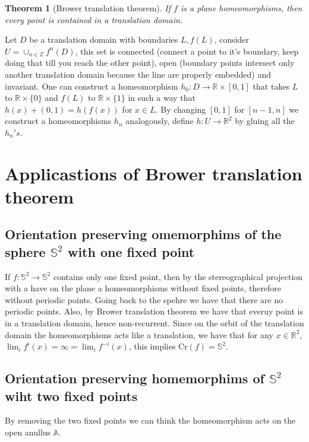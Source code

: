 \documentclass{article}
\newtheorem{theorem}{Theorem}[section]
\begin{document}
\begin{theorem}[Brower translation theorem]
    If $f$ is a plane homeomorphisms, then every point is contained in a 
    translation domain.
\end{theorem}


Let $D$ be a translation domain with boundaries $L,f(L)$, consider $U=\cup_{n\in
\mathbb{Z}}f^n(D)$, this set is connected (connect  a point to it's boundary, keep doing that till
you reach the other point), open (boundary points intersect only another translation domain 
because the line are properly embedded) and invariant. 
One can construct a homeomorphism $h_0: D\to \mathbb{R}\times [0,1]$ that takes
$L$ to $\mathbb{R}\times \{0\}$ and $f(L)$ to $\mathbb{R}\times\{1\}$ in such 
a way that $h(x)+(0,1)=h(f(x))$ for $x\in L$. By changing $[0,1]$ for $[n-1,n]$
we construct a homeomorphisms $h_n$ analogously, define $h:U\to \mathbb{R}^2$ 
by gluing all the $h_n's$. 




\section{Applicastions of Brower translation theorem}

\subsection{
    Orientation preserving omemorphims of the sphere $\mathbb{S}^2$ with one fixed point}

If $f:\mathbb{S}^2\to \mathbb{S}^2$ contains only one fixed point,
then by the stereographical projection with a have on the plane a 
homeomorphisms without fixed points, therefore without periodic points.
Going back to the spehre we have that there are no periodic points.
Also, by Brower translation theorem we have that everuy point is in a 
translation domain, hence non-recurrent. Since on the orbit of 
the translation domain the homeomorphisms acts like a translation,
we have that for any $x\in \mathbb{R}^2$, $\lim_{i}f^i(x)=\infty=\lim_{i}f^{-i}(x)$,
this implies Cr$(f)=\mathbb{S}^2$.

\subsection{Orientation preserving homemorphims of $\mathbb{S}^2$ wiht two fixed points}
By removing the two fixed points we can think the homeomorphism acts
on the open anullus $\mathbb{A}$. 
\end{document}
